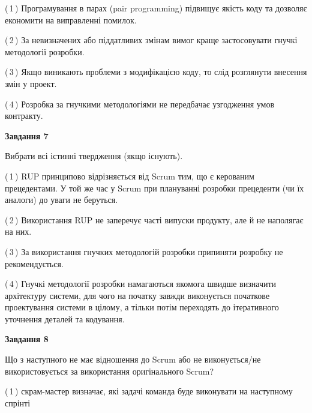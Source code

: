 \documentclass[10pt, ukrainian]{article}
\begin{document}
{\begin {large}
(\,1\,) Програмування в парах (pair programming) підвищує якість коду та дозволяє економити на виправленні помилок. %



(\,2\,) За невизначених або піддатливих змінам вимог краще застосовувати гнучкі методології розробки. %



(\,3\,) Якщо виникають проблеми з модифікацією коду, то слід розглянути внесення змін у проект. %



(\,4\,) Розробка за гнучкими методологіями не передбачає узгодження умов контракту. %


{\begin {center}\textbf{Завдання 7}\end {center}}\par
Вибрати всі істинні твердження (якщо існують).\par
\vspace{2mm}



(\,1\,) RUP принципово відрізняється від Scrum тим, що є керованим прецедентами. У той же час у Scrum при плануванні розробки прецеденти (чи їх аналоги) до уваги не беруться. %



(\,2\,) Використання RUP не заперечує часті випуски продукту, але й не наполягає на них. %



(\,3\,) За використання гнучких методологій розробки припиняти розробку не рекомендується. %



(\,4\,) Гнучкі методології розробки намагаються якомога швидше визначити архітектуру системи, для чого на початку завжди виконується початкове проектування системи в цілому, а тільки потім переходять до ітеративного уточнення деталей та кодування. %


{\begin {center}\textbf{Завдання 8}\end {center}}\par
Що з наступного не має відношення до Scrum або не виконується/не використовується за використання оригінального Scrum?\par
\vspace{2mm}



(\,1\,) скрам-мастер визначає, які задачі команда буде виконувати на наступному спрінті%




\end{large}}
\end{document}
